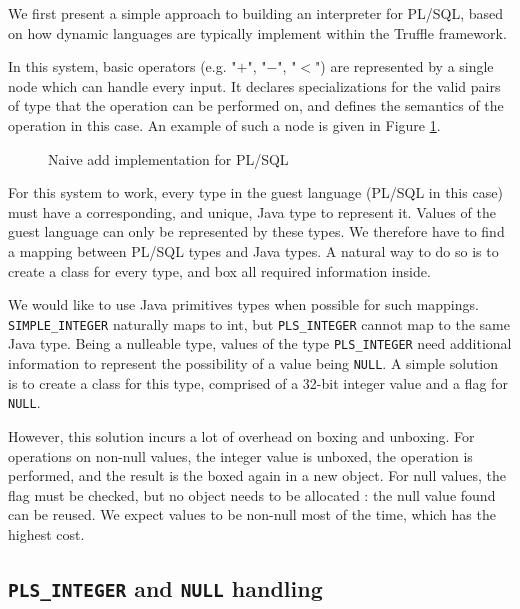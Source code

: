 \documentclass[twoside,11pt,a4paper]{article}
\newcommand{\java}[1]{\textsf{#1}}
\newcommand{\pls}[1]{\texttt{#1}}
\newcommand{\plstype}[1]{\pls{#1}}
\newcommand{\plsi}{\plstype{PLS\_INTEGER}}
\newcommand{\simpleint}{\plstype{SIMPLE\_INTEGER}}
\newcommand{\plsnull}{\pls{NULL}}
\begin{document}
We first present a simple approach to building an interpreter for PL/SQL, based on how dynamic languages are typically implement within the Truffle framework.

In this system, basic operators (e.g. "$+$", "$-$", "$<$") are represented by a single node which can handle every input. It declares specializations for the valid pairs of type that the operation can be performed on, and defines the semantics of the operation in this case. An example of such a node is given in Figure \ref{fig:naiveadd}.

\begin{figure}[t]
	
	\caption{Naive add implementation for PL/SQL}
	\label{fig:naiveadd}
\end{figure}

For this system to work, every type in the guest language (PL/SQL in this case) must have a corresponding, and unique, Java type to represent it. Values of the guest language can only be represented by these types. We therefore have to find a mapping between PL/SQL types and Java types. A natural way to do so is to create a class for every type, and box all required information inside.

We would like to use Java primitives types when possible for such mappings. \simpleint{} naturally maps to \java{int}, but \plsi{} cannot map to the same Java type. Being a nulleable type, values of the type \plsi{} need additional information to represent the possibility of a value being \plsnull{}. A simple solution is to create a class for this type, comprised of a 32-bit integer value and a flag for \plsnull{}.

However, this solution incurs a lot of overhead on boxing and unboxing. For operations on non-null values, the integer value is unboxed, the operation is performed, and the result is the boxed again in a new object. For null values, the flag must be checked, but no object needs to be allocated : the null value found can be reused. We expect values to be non-null most of the time, which has the highest cost.

\subsection{\plsi{} and \plsnull{} handling}
\end{document}
